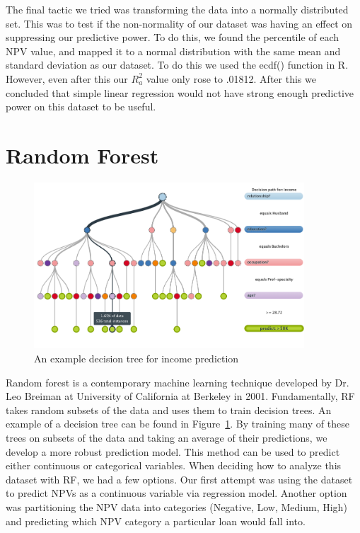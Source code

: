 \documentclass[12 pt]{uncw_thesis}
\theoremstyle{plain}
\theoremstyle{remark}
\theoremstyle{definition}
\begin{document}
The final tactic we tried was transforming the data into a normally distributed set. This was to test if the non-normality of our dataset was having an effect on suppressing our predictive power. To do this, we found the percentile of each NPV value, and mapped it to a normal distribution with the same mean and standard deviation as our dataset. To do this we used the ecdf() function in R. However, even after this our \(R_a^2\) value only rose to .01812. After this we concluded that simple linear regression would not have strong enough predictive power on this dataset to be useful.
\section{Random Forest}
\begin{figure}
	\includegraphics[width=0.9\textwidth]{images/RF.png}
	\caption{An example decision tree for income prediction}
	\label{fig:DecisionTree}
\end{figure}
Random forest is a contemporary machine learning technique developed by Dr. Leo Breiman at University of California at Berkeley in 2001\cite{RF}. Fundamentally, RF takes random subsets of the data and uses them to train decision trees. An example of a decision tree can be found in Figure~\ref{fig:DecisionTree}. By training many of these trees on subsets of the data and taking an average of their predictions, we develop a more robust prediction model. This method can be used to predict either continuous or categorical variables. When deciding how to analyze this dataset with RF, we had a few options. Our first attempt was using the dataset to predict NPVs as a continuous variable via regression model. Another option was partitioning the NPV data into categories (Negative, Low, Medium, High) and predicting which NPV category a particular loan would fall into. 
\end{document}
